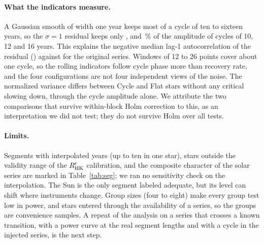 \paragraph{What the indicators measure.} A Gaussian smooth of width one year keeps most of a cycle of ten to sixteen years, so the $\sigma = 1$ residual keeps only \ResAmpTen, \ResAmpTwelve{} and \ResAmpSixteen\,\% of the amplitude of cycles of 10, 12 and 16 years. This explains the negative median lag-1 autocorrelation of the residual (\MedACSOne) against \MedACNone{} for the original series. Windows of 12 to 26 points cover about one cycle, so the rolling indicators follow cycle phase more than recovery rate, and the four configurations are not four independent views of the noise. The normalized variance differs between Cycle and Flat stars without any critical slowing down, through the cycle amplitude alone. We attribute the two comparisons that survive within-block Holm correction to this, as an interpretation we did not test; they do not survive Holm over all tests.

\paragraph{Limits.} Segments with interpolated years (up to ten in one star), stars outside the validity range of the $R'_{\rm HK}$ calibration, and the composite character of the solar series are marked in Table~\ref{tab:seg}; we ran no sensitivity check on the interpolation. The Sun is the only segment labeled adequate, but its level can shift where instruments change. Group sizes (four to eight) make every group test low in power, and stars entered through the availability of a series, so the groups are convenience samples. A repeat of the analysis on a series that crosses a known transition, with a power curve at the real segment lengths and with a cycle in the injected series, is the next step.
